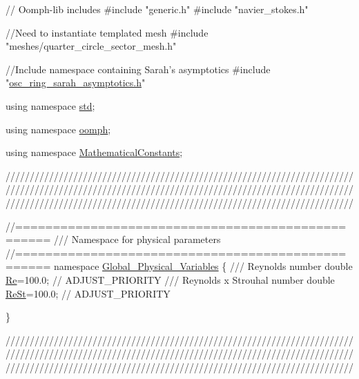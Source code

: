 \begin{DoxyCodeInclude}
\textcolor{comment}{// Oomph-lib includes}
\textcolor{preprocessor}{#include "generic.h"}
\textcolor{preprocessor}{#include "navier\_stokes.h"}

\textcolor{comment}{//Need to instantiate templated mesh}
\textcolor{preprocessor}{#include "meshes/quarter\_circle\_sector\_mesh.h"}

\textcolor{comment}{//Include namespace containing Sarah's asymptotics }
\textcolor{preprocessor}{#include "\hyperlink{osc__ring__sarah__asymptotics_8h}{osc\_ring\_sarah\_asymptotics.h}"}


\textcolor{keyword}{using namespace }\hyperlink{namespacestd}{std};

\textcolor{keyword}{using namespace }\hyperlink{namespaceoomph}{oomph};

\textcolor{keyword}{using namespace }\hyperlink{namespaceMathematicalConstants}{MathematicalConstants};

  
\textcolor{comment}{}
\textcolor{comment}{////////////////////////////////////////////////////////////////////////}
\textcolor{comment}{////////////////////////////////////////////////////////////////////////}
\textcolor{comment}{////////////////////////////////////////////////////////////////////////}
\textcolor{comment}{}  

\textcolor{comment}{//==================================================}\textcolor{comment}{}
\textcolor{comment}{/// Namespace for physical parameters}
\textcolor{comment}{}\textcolor{comment}{//==================================================}
\textcolor{keyword}{namespace }\hyperlink{namespaceGlobal__Physical__Variables}{Global\_Physical\_Variables}
\{
\textcolor{comment}{}
\textcolor{comment}{ /// Reynolds number}
\textcolor{comment}{} \textcolor{keywordtype}{double} \hyperlink{namespaceGlobal__Physical__Variables_ab814e627d2eb5bc50318879d19ab16b9}{Re}=100.0;  \textcolor{comment}{// ADJUST\_PRIORITY }
\textcolor{comment}{}
\textcolor{comment}{ /// Reynolds x Strouhal number}
\textcolor{comment}{} \textcolor{keywordtype}{double} \hyperlink{namespaceGlobal__Physical__Variables_a085ee4bf968ffdd01a41b8c41864f907}{ReSt}=100.0; \textcolor{comment}{// ADJUST\_PRIORITY }

\}



\textcolor{comment}{}
\textcolor{comment}{////////////////////////////////////////////////////////////////////////}
\textcolor{comment}{////////////////////////////////////////////////////////////////////////}
\textcolor{comment}{////////////////////////////////////////////////////////////////////////}
\textcolor{comment}{}


\end{DoxyCodeInclude}
